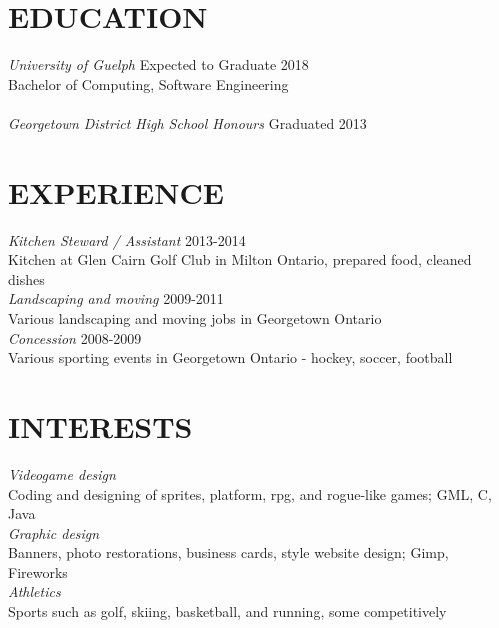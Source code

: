 \documentclass[line, margin]{res}
\begin{document}
\begin{resume}
\section{EDUCATION}
{\color{darkgrey}
\textit{University of Guelph} \hfill Expected to Graduate 2018\\
Bachelor of Computing, Software Engineering\\\\
\textit{Georgetown District High School Honours} \hfill Graduated 2013\\}

\section{EXPERIENCE}
{\color{darkgrey}\textit{Kitchen Steward / Assistant} \hfill 2013-2014 \\
Kitchen at Glen Cairn Golf Club in Milton Ontario, prepared food, cleaned dishes \\ [10pt]
\textit{Landscaping and moving} \hfill 2009-2011 \\
Various landscaping and moving jobs in Georgetown Ontario\\ [10pt]
\textit{Concession} \hfill 2008-2009 \\
Various sporting events in Georgetown Ontario - hockey, soccer, football\\ 
}

\section{INTERESTS}
{\color{darkgrey}\textit{Videogame design} \\
Coding and designing of sprites, platform, rpg, and rogue-like games; GML, C, Java\\ [10pt]
\textit{Graphic design} \\
Banners, photo restorations, business cards, style website design; Gimp, Fireworks\\ [10pt]	
\textit{Athletics} \\
Sports such as golf, skiing, basketball, and running, some competitively
}

\end{resume}
\end{document}
